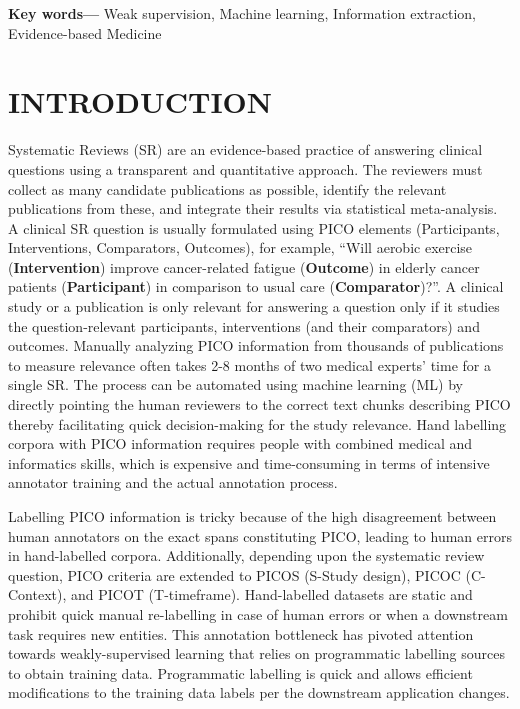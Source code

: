 \documentclass[10.7pt,]{article}
\providecommand{\keywords}[1]
{
  \small	
  \textbf{Key words---} #1
}
\begin{document}
\keywords{Weak supervision, Machine learning, Information extraction, Evidence-based Medicine}


%
\clearpage
%
\section{\textbf{INTRODUCTION}}\label{introduction}
%
Systematic Reviews (SR) are an evidence-based practice of answering clinical questions using a transparent and quantitative approach.
The reviewers must collect as many candidate publications as possible, identify the relevant publications from these, and integrate their results via statistical meta-analysis.
A clinical SR question is usually formulated using PICO elements (Participants, Interventions, Comparators, Outcomes), for example, ``Will aerobic exercise (\textbf{Intervention}) improve cancer-related fatigue (\textbf{Outcome}) in elderly cancer patients (\textbf{Participant}) in comparison to usual care (\textbf{Comparator})?''.
A clinical study or a publication is only relevant for answering a question only if it studies the question-relevant participants, interventions (and their comparators) and outcomes.\cite{uman2011systematic} 
Manually analyzing PICO information from thousands of publications to measure relevance often takes 2-8 months of two medical experts' time for a single SR.\cite{borah2017analysis}
The process can be automated using machine learning (ML) by directly pointing the human reviewers to the correct text chunks describing PICO thereby facilitating quick decision-making for the study relevance.
Hand labelling corpora with PICO information requires people with combined medical and informatics skills, which is expensive and time-consuming in terms of intensive annotator training and the actual annotation process.

Labelling PICO information is tricky because of the high disagreement between human annotators on the exact spans constituting PICO, leading to human errors in hand-labelled corpora.\cite{brockmeier2019improving}
Additionally, depending upon the systematic review question, PICO criteria are extended to PICOS (S-Study design), PICOC (C-Context), and PICOT (T-timeframe).\cite{riva2012your,methley2014pico,uman2011systematic}
Hand-labelled datasets are static and prohibit quick manual re-labelling in case of human errors or when a downstream task requires new entities.
This annotation bottleneck has pivoted attention towards weakly-supervised learning that relies on programmatic labelling sources to obtain training data.
Programmatic labelling is quick and allows efficient modifications to the training data labels per the downstream application changes.
\end{document}
